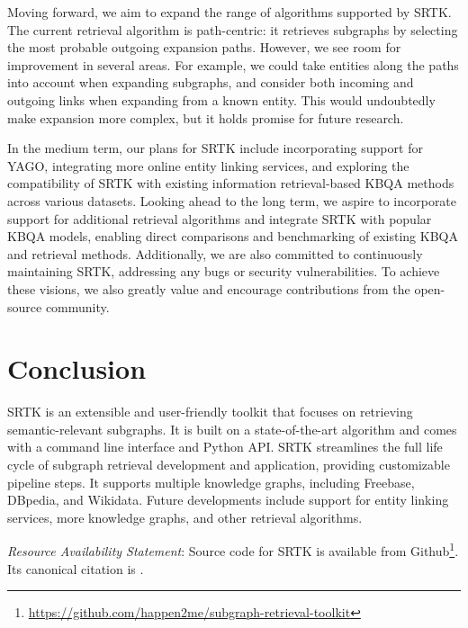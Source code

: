 \documentclass[runningheads]{llncs}
\begin{document}
Moving forward, we aim to expand the range of algorithms supported by SRTK. The current retrieval algorithm is path-centric: it retrieves subgraphs by selecting the most probable outgoing expansion paths. However, we see room for improvement in several areas. For example, we could take entities along the paths into account when expanding subgraphs, and consider both incoming and outgoing links when expanding from a known entity. This would undoubtedly make expansion more complex, but it holds promise for future research.


In the medium term, our plans for SRTK include incorporating support for YAGO, integrating more online entity linking services, and exploring the compatibility of SRTK with existing information retrieval-based KBQA methods across various datasets. Looking ahead to the long term, we aspire to incorporate support for additional retrieval algorithms and integrate SRTK with popular KBQA models, enabling direct comparisons and benchmarking of existing KBQA and retrieval methods. Additionally, we are also committed to continuously maintaining SRTK, addressing any bugs or security vulnerabilities. To achieve these visions, we also greatly value and encourage contributions from the open-source community.

\section{Conclusion}

SRTK is an extensible and user-friendly toolkit that focuses on retrieving semantic-relevant subgraphs. It is built on a state-of-the-art algorithm and comes with a command line interface and Python API. SRTK streamlines the full life cycle of subgraph retrieval development and application, providing customizable pipeline steps. It supports multiple knowledge graphs, including Freebase, DBpedia, and Wikidata. Future developments include support for entity linking services, more knowledge graphs, and other retrieval algorithms.

\bigskip

\noindent \textit{Resource Availability Statement}: Source code for SRTK is available from Github\footnote{\url{https://github.com/happen2me/subgraph-retrieval-toolkit}}. Its canonical citation is \cite{shen2023srtk}.

%
%


\end{document}
